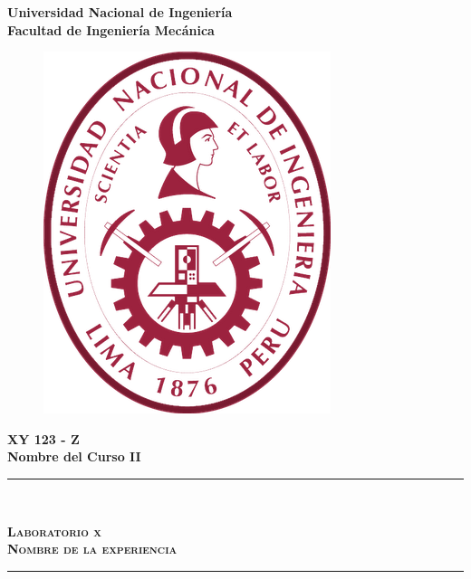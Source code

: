 \begin{titlepage}
	\begin{center}
		
		{\LARGE \textbf{Universidad Nacional de Ingeniería}}\\
		\vspace{10pt}
		{\large \textbf{Facultad de Ingeniería Mecánica}}\\
		\vspace{25pt}
				
		\begin{figure}[h]
			\centering
			\includegraphics[scale = .5]{caratula/uni-logo}		
		\end{figure}
		\vspace{25pt}
		
		{\Large \textbf{XY 123 - Z}}\\
		\vspace{10pt}		
		{\large \textbf{Nombre del Curso II}}\\
		\vspace{15pt}		
		
		\rule{\linewidth}{1pt}\\
		\vspace{3mm}
		
		\begin{spacing}{1.5}
			\textsc{{\LARGE \textbf{Laboratorio x}}\\
			{\large \textbf{Nombre de la experiencia}}}
		\end{spacing}
		
		\rule{\linewidth}{1pt}\\
		\vspace{15pt}
		

\end{center}
\end{titlepage}
